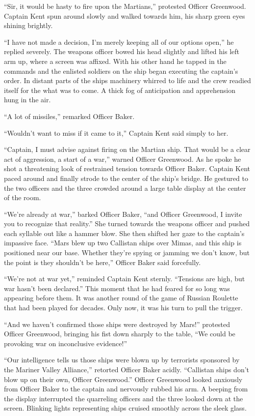 \documentclass[openany, 12pt]{book} %
\begin{document}
``Sir, it would be hasty to fire upon the Martians,'' protested Officer Greenwood. Captain Kent spun around slowly and walked towards him, his sharp green eyes shining brightly.

``I have not made a decision, I'm merely keeping all of our options open,'' he replied severely. The weapons officer bowed his head slightly and lifted his left arm up, where a screen was affixed. With his other hand he tapped in the commands and the enlisted soldiers on the ship began executing the captain's order. In distant parts of the ships machinery whirred to life and the crew readied itself for the what was to come. A thick fog of anticipation and apprehension hung in the air.

``A lot of missiles,'' remarked Officer Baker. 

``Wouldn't want to miss if it came to it,'' Captain Kent said simply to her.

``Captain, I must advise against firing on the Martian ship. That would be a clear act of aggression, a start of a war,'' warned Officer Greenwood. As he spoke he shot a threatening look of restrained tension towards Officer Baker. Captain Kent paced around and finally strode to the center of the ship's bridge. He gestured to the two officers and the three crowded around a large table display at the center of the room.

``We're already at war,'' barked Officer Baker, ``and Officer Greenwood, I invite you to recognize that reality.'' She turned towards the weapons officer and pushed each syllable out like a hammer blow. She then shifted her gaze to the captain's impassive face. ``Mars blew up two Callistan ships over Mimas, and this ship is positioned near our base. Whether they're spying or jamming we don't know, but the point is they shouldn't be here,'' Officer Baker said forcefully.

``We're not at war yet,'' reminded Captain Kent sternly. ``Tensions are high, but war hasn't been declared.'' This moment that he had feared for so long was appearing before them. It was another round of the game of Russian Roulette that had been played for decades. Only now, it was his turn to pull the trigger.

``And we haven't confirmed those ships were destroyed by Mars!'' protested Officer Greenwood,  bringing his fist down sharply to the table, ``We could be provoking war on inconclusive evidence!''

``Our intelligence tells us those ships were blown up by terrorists sponsored by the Mariner Valley Alliance,'' retorted Officer Baker acidly. ``Callistan ships don't blow up on their own, Officer Greenwood.'' Officer Greenwood looked anxiously from Officer Baker to the captain and nervously rubbed his arm. A beeping from the display interrupted the quarreling officers and the three looked down at the screen. Blinking lights representing ships cruised smoothly across the sleek glass.
\end{document}
